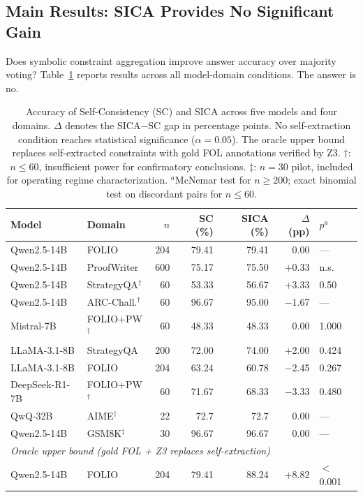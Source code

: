 \subsection{Main Results: SICA Provides No Significant Gain}
\label{sec:main-results}

Does symbolic constraint aggregation improve answer accuracy over majority voting? Table~\ref{tab:main_results} reports results across all model-domain conditions. The answer is no.

\begin{table}[t]
\centering
\small
\caption{Accuracy of Self-Consistency (SC) and SICA across five models and four domains. $\Delta$ denotes the SICA$-$SC gap in percentage points. No self-extraction condition reaches statistical significance ($\alpha = 0.05$). The oracle upper bound replaces self-extracted constraints with gold FOL annotations verified by Z3. $\dagger$: $n \leq 60$, insufficient power for confirmatory conclusions. $\ddagger$: $n=30$ pilot, included for operating regime characterization. $^a$McNemar test for $n \geq 200$; exact binomial test on discordant pairs for $n \leq 60$.}
\label{tab:main_results}
\begin{tabular}{@{}llrrrrl@{}}
\toprule
Model & Domain & $n$ & SC (\%) & SICA (\%) & $\Delta$ (pp) & $p^a$ \\
\midrule
Qwen2.5-14B & FOLIO & 204 & 79.41 & 79.41 & 0.00 & --- \\
Qwen2.5-14B & ProofWriter & 600 & 75.17 & 75.50 & $+$0.33 & n.s. \\
Qwen2.5-14B & StrategyQA$^\dagger$ & 60 & 53.33 & 56.67 & $+$3.33 & 0.50 \\
Qwen2.5-14B & ARC-Chall.$^\dagger$ & 60 & 96.67 & 95.00 & $-$1.67 & --- \\
Mistral-7B & FOLIO+PW$^\dagger$ & 60 & 48.33 & 48.33 & 0.00 & 1.000 \\
LLaMA-3.1-8B & StrategyQA & 200 & 72.00 & 74.00 & $+$2.00 & 0.424 \\
LLaMA-3.1-8B & FOLIO & 204 & 63.24 & 60.78 & $-$2.45 & 0.267 \\
DeepSeek-R1-7B & FOLIO+PW$^\dagger$ & 60 & 71.67 & 68.33 & $-$3.33 & 0.480 \\
QwQ-32B & AIME$^\dagger$ & 22 & 72.7 & 72.7 & 0.00 & --- \\
Qwen2.5-14B & GSM8K$^\ddagger$ & 30 & 96.67 & 96.67 & 0.00 & --- \\
\midrule
\multicolumn{7}{l}{\textit{Oracle upper bound (gold FOL + Z3 replaces self-extraction)}} \\
Qwen2.5-14B & FOLIO & 204 & 79.41 & 88.24 & $+$8.82 & $<$0.001 \\
\bottomrule
\end{tabular}
\end{table}

